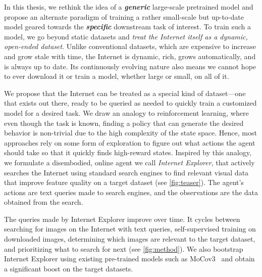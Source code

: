 In this thesis, we rethink the idea of a \textit{\textbf{generic}} large-scale pretrained model and propose an alternate paradigm of training a rather small-scale but up-to-date model geared towards the \textit{\textbf{specific}} downstream task of interest. To train such a model, we go beyond static datasets and \textit{treat the Internet itself as a dynamic, open-ended dataset}. Unlike conventional datasets, which are expensive to increase and grow stale with time,
the Internet is dynamic, rich, grows automatically, and is always up to date.
Its continuously evolving nature also means we cannot hope to ever download it or train a model, whether large or small, on all of it.

We propose that the Internet can be treated as a special kind of dataset---one that exists out there, ready to be queried as needed to quickly train a customized model for a desired task.
We draw an analogy to reinforcement learning, where even though the task is known, finding a policy that can generate the desired behavior is non-trivial due to the high complexity of the state space. Hence, most approaches rely on some form of exploration to figure out what actions the agent should take so that it quickly finds high-reward states. Inspired by this analogy, we formulate a disembodied, online agent we call {\em Internet Explorer}, that actively searches the Internet using standard search engines to find relevant visual data that improve feature quality on a target dataset (see \cref{fig:teaser}). The agent's actions are text queries made to search engines, and the observations are the data obtained from the search.

The queries made by Internet Explorer improve over time. It cycles between searching for images on the Internet with text queries, self-supervised training on downloaded images, determining which images are relevant to the target dataset, and prioritizing what to search for next (see \cref{fig:method}). We also bootstrap Internet Explorer using existing pre-trained models such as MoCov3~\cite{he2020momentum} and obtain a significant boost on the target datasets.

